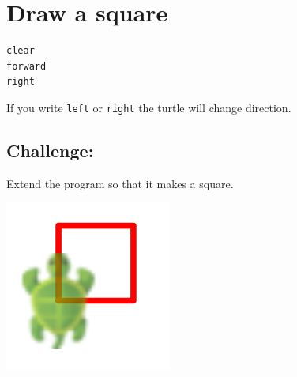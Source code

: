 \chapter{Draw a square}
\begin{multicols}{2}

\begin{lstlisting}[basicstyle={\ttfamily\fontsize{30}{36}\selectfont},numbers=none]
clear
forward
right
\end{lstlisting}
        
If you write \lstinline{left} or \lstinline{right} the turtle will change direction.
\section*{\color{BrickRed}Challenge:}
Extend the program so that it makes a square.

\columnbreak

\begin{center}
\includegraphics{../img/square.png}
\end{center}

\end{multicols}

